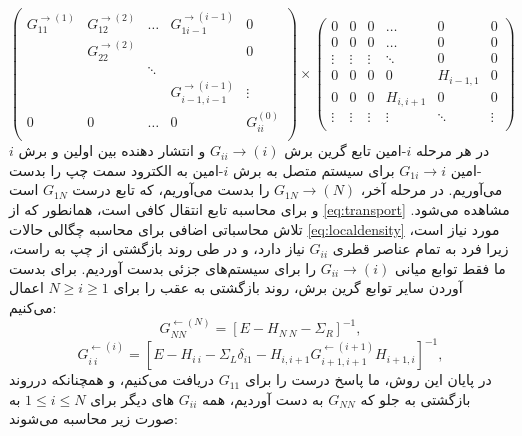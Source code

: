 \begin{equation}
    \left( \begin{matrix}
        G_{11}^{\to (1)} & G_{12}^{\to (2)} & \ldots  & G_{1i-1}^{\to (i-1)} & 0  \\
        {} & G_{22}^{\to (2)} & {} & {} & 0  \\
        {} & {} & \ddots  & {} & {}  \\
        {} & {} & {} & G_{i-1,i-1}^{\to (i-1)} & \vdots   \\
        0 & 0 & \ldots  & 0 & G_{ii}^{(0)}  \\
        \end{matrix} \right)\times \left( \begin{matrix}
        0 & 0 & 0 & \ldots  & 0 & 0  \\
        0 & 0 & 0 & \ldots  & 0 & 0  \\
        \vdots  & \vdots  & \vdots  & \ddots  & 0 & 0  \\
        0 & 0 & 0 & 0 & {{H}_{i-1,1}} & 0  \\
        0 & 0 & 0 & {{H}_{i,i+1}} & 0 & 0  \\
        \vdots  & \vdots  & \vdots  & \vdots  & \ddots  & \vdots   \\
    \end{matrix} \right)
\end{equation}
در هر مرحله $i$-امین تابع گرین برش $G_{ii}\rightarrow(i)$ و انتشار دهنده بین اولین و برش $i$-امین $G_{1i}\rightarrow{i}$ برای سیستم متصل به برش $i$-امین به الکترود سمت چپ را بدست می‌آوریم. در مرحله آخر، $G_{1N}\rightarrow(N)$ را بدست می‌آوریم، که تابع درست $G_{1N}$ است و برای محاسبه تابع انتقال کافی است، همانطور که از \ref{eq:transport} مشاهده می‌شود.
تلاش محاسباتی اضافی برای محاسبه چگالی حالات \ref{eq:localdensity} مورد نیاز است، زیرا فرد به تمام عناصر قطری $G_{ii}$ نیاز دارد، و در طی روند بازگشتی از چپ به راست، ما فقط توابع میانی $G_{ii}\rightarrow(i)$ را برای سیستم‌های جزئی بدست آوردیم. برای بدست آوردن سایر توابع گرین برش، روند بازگشتی به عقب را برای $N ≥ i ≥ 1$ اعمال می‌کنیم:
\begin{equation}
    G_{NN}^{\leftarrow (N)}={{\left[ E-{{H}_{N\ N}}-{{\Sigma }_{R}} \right]}^{-1}},
\end{equation}
\begin{equation}
    G_{i\ i}^{\leftarrow (i)}={{\left[ E-{{H}_{i\ i}}-{{\Sigma }_{L}}{{\delta }_{i1}}-{{H}_{i,i+1}}G_{i+1,i+1}^{\leftarrow (i+1)}{{H}_{i+1,i}} \right]}^{-1}},
\end{equation}
در پایان این روش، ما پاسخ درست را برای $G_{11}$ دریافت می‌کنیم، و همچنانکه درروند بازگشتی به جلو که $G_{NN}$ به دست آوردیم، همه $G_{ii}$ های دیگر برای  $1≤ i ≤ N$ به صورت زیر محاسبه می‌شوند:
